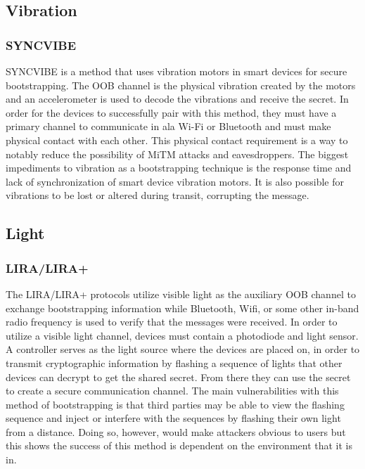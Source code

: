 \subsection{Vibration}
\subsubsection{SYNCVIBE}
SYNCVIBE is a method that uses vibration motors in smart devices for secure bootstrapping. The OOB channel is the physical vibration created by the motors and an accelerometer is used to decode the vibrations and receive the secret. In order for the devices to successfully pair with this method, they must have a primary channel to communicate in ala Wi-Fi or Bluetooth and must make physical contact with each other. This physical contact requirement is a way to notably reduce the possibility of MiTM attacks and eavesdroppers. The biggest impediments to vibration as a bootstrapping technique is the response time and lack of synchronization of smart device vibration motors. It is also possible for vibrations to be lost or altered during transit, corrupting the message.


\subsection{Light}
\subsubsection{LIRA/LIRA+}
The LIRA/LIRA+ protocols utilize visible light as the auxiliary OOB channel to exchange bootstrapping information while Bluetooth, Wifi, or some other in-band radio frequency is used to verify that the messages were received. In order to utilize a visible light channel, devices must contain a photodiode and light sensor. A controller serves as the light source where the devices are placed on, in order to transmit cryptographic information by flashing a sequence of lights that other devices can decrypt to get the shared secret. From there they can use the secret to create a secure communication channel. The main vulnerabilities with this method of bootstrapping is that third parties may be able to view the flashing sequence and inject or interfere with the sequences by flashing their own light from a distance. Doing so, however, would make attackers obvious to users but this shows the success of this method is dependent on the environment that it is in.

